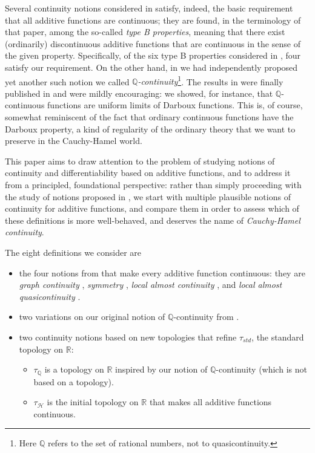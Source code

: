 \documentclass[11pt]{amsart} %
\theoremstyle{definition}
\newcommand{\R}{\mathbb{R}}
\newcommand{\Q}{\mathbb{Q}}
\newcommand{\AD}{\mathcal{H}}
\begin{document}
Several continuity notions considered in \cite{11} satisfy, indeed, the basic requirement that all additive functions are continuous; they are found, in the terminology of that paper, among the so-called \emph{type B properties}, meaning that there exist (ordinarily) discontinuous additive functions that are continuous in the sense of the given property.  Specifically, of the six type B properties considered in \cite{11}, four satisfy our requirement. On the other hand, in \cite{9} we had independently proposed yet another such notion we called \emph{$\Q$-continuity}\footnote{Here $\Q$ refers to the set of rational numbers, not to quasicontinuity.}.  
The results in \cite{9} were finally published in \cite{10} and were mildly encouraging: we showed, for instance, that $\Q$-continuous functions are uniform limits of Darboux functions. This is, of course, somewhat reminiscent of the fact that ordinary continuous functions have the Darboux property, a kind of regularity of the ordinary theory that we want to preserve in the Cauchy-Hamel world. 

This paper aims to draw attention to the problem of studying notions of continuity
and differentiability based on additive functions, and to address it from a principled, foundational perspective:  rather than simply proceeding with the study of  notions proposed in \cite{9,10}, we start with multiple plausible notions of continuity for additive functions, and compare them in order to assess which of these definitions is more well-behaved, and deserves the name of \emph{Cauchy-Hamel continuity}.

The eight definitions we consider are 
\begin{itemize}
\item[(i).] the four notions from \cite{11} that make every additive function continuous: they are \emph{graph continuity} \cite{20}, \emph{symmetry} \cite{19}, \emph{local almost continuity} \cite{21}, and \emph{local almost quasicontinuity} \cite{21}. 
\item[(ii).] two variations on our original notion of $\Q$-continuity from \cite{10}. 
\item[(iii).] two continuity notions based on new topologies that refine $\tau_{std}$, the standard topology
on $\R$:

\begin{itemize} 
\item $\tau_{\Q}$ is a topology on $\R$ inspired by our notion of $\Q$-continuity (which is not
based on a topology).

\item $\tau_{\AD}$ is the initial topology on $\R$ that makes all additive functions continuous.

\end{itemize} 
\end{itemize} 
\end{document}
